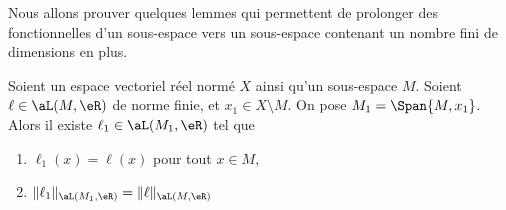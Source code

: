 	Nous allons prouver quelques lemmes qui permettent de prolonger des fonctionnelles d'un sous-espace vers un sous-espace contenant un nombre fini de dimensions en plus.

	\begin{lemma}     \label{LEMooHWSJooGVmIPV}
		Soient un espace vectoriel réel normé \( X\) ainsi qu'un sous-espace \( M\). Soient \( \ell\in\aL(M,\eR)\) de norme finie, et \( x_1\in X\setminus M\). On pose \( M_1=\Span\{ M, x_1 \}\). Alors il existe \( \ell_1\in\aL(M_1,\eR)\) tel que
		\begin{enumerate}
			\item
			      \( \ell_1(x)=\ell(x)\) pour tout \( x\in M\),
			\item
			      \( \| \ell_1 \|_{\aL(M_1,\eR)}=\| \ell \|_{\aL(M,\eR)}\)
		\end{enumerate}
	\end{lemma}


